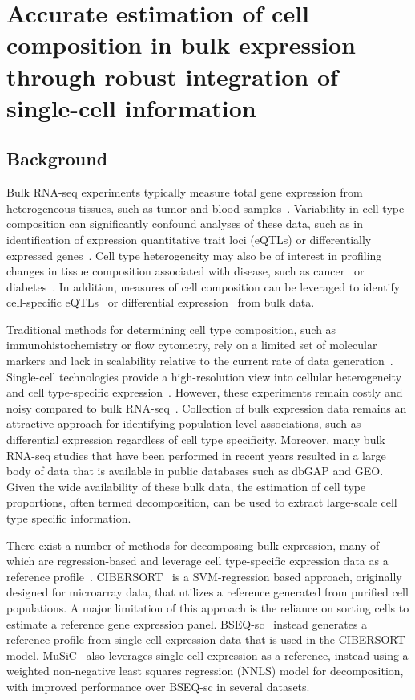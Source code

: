 \chapter{Accurate estimation of cell composition in bulk expression through robust integration of single-cell information}

\section{Background}

Bulk RNA-seq experiments typically measure total gene expression from heterogeneous tissues, such as tumor and blood samples~\cite{Tomczak2015-kt,GTEx_Consortium2015-vl}. Variability in cell type composition can significantly confound analyses of these data, such as in identification of expression quantitative trait loci (eQTLs) or differentially expressed genes~\cite{Bruning2016-vb}. Cell type heterogeneity may also be of interest in profiling changes in tissue composition associated with disease, such as cancer~\cite{Fridman2012-bi} or diabetes~\cite{Rahier1983-gh}. In addition, measures of cell composition can be leveraged to identify cell-specific eQTLs~\cite{Shen-Orr2010-tg,Westra2015-vq} or differential expression~\cite{Shen-Orr2010-tg} from bulk data. 

Traditional methods for determining cell type composition, such as immunohistochemistry or flow cytometry, rely on a limited set of molecular markers and lack in scalability relative to the current rate of data generation~\cite{Hu2016-he}. Single-cell technologies provide a high-resolution view into cellular heterogeneity and cell type-specific expression~\cite{Zheng2017-pq,Tasic2018-ue,Macosko2015-yn}. However, these experiments remain costly and noisy compared to bulk RNA-seq~\cite{Wang2018-oj}. Collection of bulk expression data remains an attractive approach for identifying population-level associations, such as differential expression regardless of cell type specificity. Moreover, many bulk RNA-seq studies that have been performed in recent years resulted in a large body of data that is available in public databases such as dbGAP and GEO. Given the wide availability of these bulk data, the estimation of cell type proportions, often termed decomposition, can be used to extract large-scale cell type specific information.

There exist a number of methods for decomposing bulk expression, many of which are regression-based and leverage cell type-specific expression data as a reference profile~\cite{Mohammadi2017-rw}. CIBERSORT~\cite{Newman2015-iw} is a SVM-regression based approach, originally designed for microarray data, that utilizes a reference generated from purified cell populations. A major limitation of this approach is the reliance on sorting cells to estimate a reference gene expression panel. BSEQ-sc~\cite{Baron2016-hb} instead generates a reference profile from single-cell expression data that is used in the CIBERSORT model. MuSiC~\cite{Wang2019-lc} also leverages single-cell expression as a reference, instead using a weighted non-negative least squares regression (NNLS) model for decomposition, with improved performance over BSEQ-sc in several datasets.


